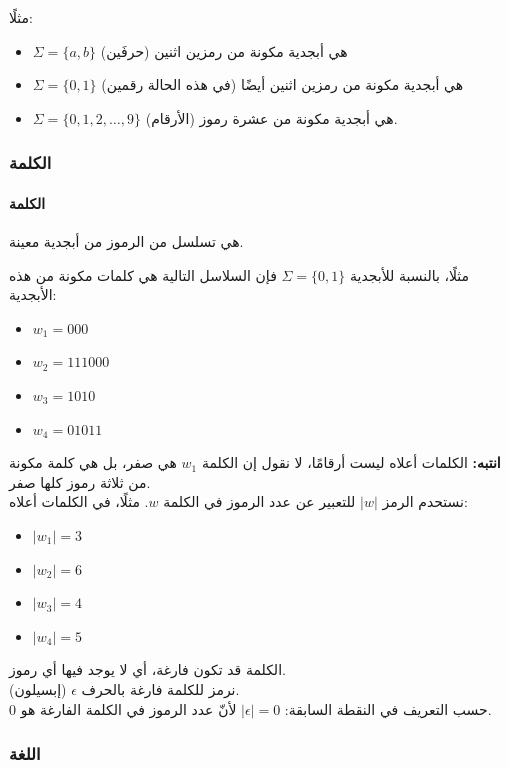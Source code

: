 \documentclass[12pt]{article}
\begin{document}
مثلًا:
\begin{itemize}
    \item $\Sigma = \{a, b\}$ هي أبجدية مكونة من رمزين اثنين (حرفَين)
    \item $\Sigma = \{0, 1\}$ هي أبجدية مكونة من رمزين اثنين أيضًا (في هذه الحالة رقمين)
    \item $\Sigma = \{0, 1, 2, \dots, 9\}$ هي أبجدية مكونة من عشرة رموز (الأرقام).
\end{itemize}


\subsubsection{الكلمة}

\paragraph{الكلمة} هي تسلسل من الرموز من أبجدية معينة.

مثلًا، بالنسبة للأبجدية $\Sigma = \{0, 1\}$ فإن السلاسل التالية هي كلمات مكونة من هذه الأبجدية:
\begin{itemize}
    \item $w_1 = 000$
    \item $w_2 = 111000$
    \item $w_3 = 1010$
    \item $w_4 = 01011$
\end{itemize}

\textbf{انتبه:} الكلمات أعلاه ليست أرقامًا، لا نقول إن الكلمة $w_1$ هي صفر، بل هي كلمة مكونة من ثلاثة رموز كلها صفر. \\
نستحدم الرمز $|w|$ للتعبير عن عدد الرموز في الكلمة $w$.
مثلًا، في الكلمات أعلاه:
\begin{itemize}
    \item $|w_1| = 3$
    \item $|w_2| = 6$
    \item $|w_3| = 4$
    \item $|w_4| = 5$
\end{itemize}

\begin{attention}
    الكلمة قد تكون فارغة، أي لا يوجد فيها أي رموز. \\
    نرمز للكلمة فارغة بالحرف $\epsilon$ (إبسيلون). \\
    حسب التعريف في النقطة السابقة: $|\epsilon| = 0$ لأنّ عدد الرموز في الكلمة الفارغة هو 0.
\end{attention}

\subsubsection{اللغة}
\end{document}

